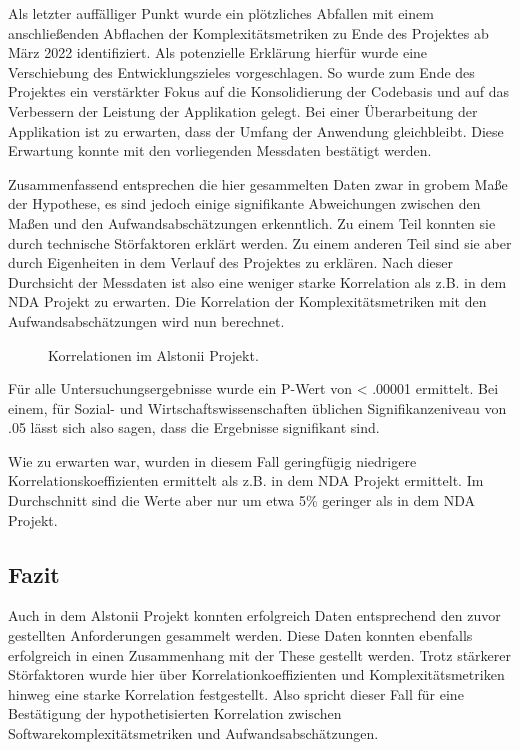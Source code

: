 Als letzter auffälliger Punkt wurde ein plötzliches Abfallen mit einem
anschlie\ss enden Abflachen der Komplexitätsmetriken zu Ende des Projektes
ab März 2022 identifiziert. Als potenzielle Erklärung hierfür wurde eine
Verschiebung des Entwicklungszieles vorgeschlagen. So wurde zum Ende des
Projektes ein verstärkter Fokus auf die Konsolidierung der Codebasis und
auf das Verbessern der Leistung der Applikation gelegt. Bei einer
Überarbeitung der Applikation ist zu erwarten, dass der Umfang der
Anwendung gleichbleibt. Diese Erwartung konnte mit den vorliegenden
Messdaten bestätigt werden.

Zusammenfassend entsprechen die hier gesammelten Daten zwar in grobem
Ma\ss e der Hypothese, es sind jedoch einige signifikante Abweichungen
zwischen den Ma\ss en und den Aufwandsabschätzungen erkenntlich. Zu einem
Teil konnten sie durch technische Störfaktoren erklärt werden. Zu einem
anderen Teil sind sie aber durch Eigenheiten in dem Verlauf des
Projektes zu erklären. Nach dieser Durchsicht der Messdaten ist also
eine weniger starke Korrelation als z.B. in dem \ac{NDA} Projekt zu erwarten.
Die Korrelation der Komplexitätsmetriken mit den Aufwandsabschätzungen
wird nun berechnet.

\begin{figure}\label{alstonii-correlation-graph}
  \begin{center}
      
  \end{center}
  \caption{Korrelationen im Alstonii Projekt.}
\end{figure} 

Für alle Untersuchungsergebnisse wurde ein P-Wert von \textless{} .00001
ermittelt.
Bei einem, für Sozial- und Wirtschaftswissenschaften üblichen
Signifikanzeniveau von .05 lässt sich also sagen, dass die Ergebnisse
signifikant sind.

Wie zu erwarten war, wurden in diesem Fall geringfügig niedrigere
Korrelationskoeffizienten ermittelt als z.B. in dem \ac{NDA} Projekt
ermittelt. Im Durchschnitt sind die Werte aber nur um etwa 5\% geringer
als in dem \ac{NDA} Projekt.

\subsection{Fazit}\label{Alstonii-fazit}

Auch in dem Alstonii Projekt konnten erfolgreich Daten entsprechend
den zuvor gestellten Anforderungen gesammelt werden. Diese Daten konnten
ebenfalls erfolgreich in einen Zusammenhang mit der These gestellt
werden. Trotz stärkerer Störfaktoren wurde hier über
Korrelationkoeffizienten und Komplexitätsmetriken hinweg eine starke
Korrelation festgestellt. Also spricht dieser Fall für eine Bestätigung
der hypothetisierten Korrelation zwischen Softwarekomplexitätsmetriken
und Aufwandsabschätzungen.

